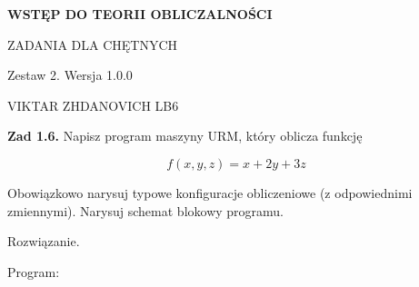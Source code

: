 \documentclass[12pt]{article}
\begin{document}
\begin{titlepage}
	\begin{center}
		{\LARGE\bfseries WSTĘP DO TEORII 			OBLICZALNOŚCI\par}
		\vspace{3cm}
		ZADANIA DLA CHĘTNYCH \par
		Zestaw 2. Wersja 1.0.0 \par
	\end{center}
	\vfill\centering VIKTAR ZHDANOVICH LB6 \par
\end{titlepage}

\newpage

\noindent\textbf{Zad 1.6.} Napisz program maszyny URM, który oblicza funkcję

\[ 
	f(x,y,z) = x + 2y + 3z 
\]

Obowiązkowo narysuj typowe konfiguracje obliczeniowe (z odpowiednimi zmiennymi). Narysuj schemat blokowy programu.

Rozwiązanie.

\vspace{5pt}

Program:

\vspace{5pt}
\end{document}
